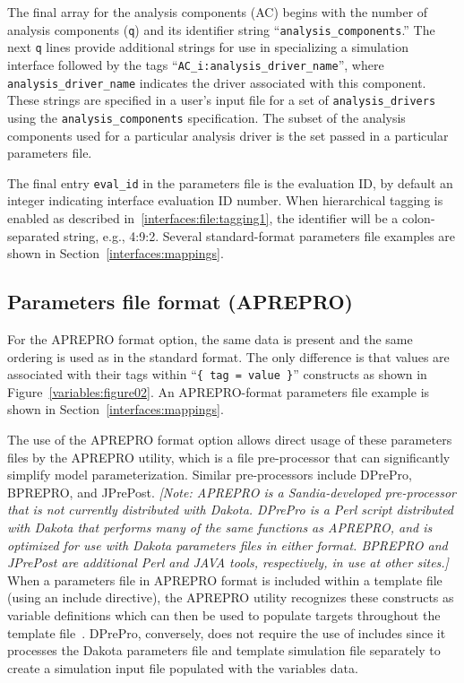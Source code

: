 The final array for the analysis components (AC) begins with the
number of analysis components (\texttt{q}) and its identifier string
``\texttt{analysis\_components}.'' The next \texttt{q} lines provide
additional strings for use in specializing a simulation interface
followed by the tags ``\texttt{AC\_i:analysis\_driver\_name}'', where
\texttt{analysis\_driver\_name} indicates the driver associated with
this component.  These strings are specified in a user's input file
for a set of \texttt{analysis\_drivers} using the
\texttt{analysis\_components} specification.  The subset of the
analysis components used for a particular analysis driver is the set
passed in a particular parameters file.

The final entry {\tt eval\_id} in the parameters file is the
evaluation ID, by default an integer indicating interface evaluation
ID number.  When hierarchical tagging is enabled as described
in~\ref{interfaces:file:tagging1}, the identifier will be a
colon-separated string, e.g., 4:9:2.  Several standard-format
parameters file examples are shown in
Section~\ref{interfaces:mappings}.

\subsection{Parameters file format (APREPRO)}\label{variables:parameters:aprepro}

For the APREPRO format option, the same data is present and the same
ordering is used as in the standard format. The only difference is
that values are associated with their tags within ``\texttt{\{ tag =
value \}}'' constructs as shown in Figure~\ref{variables:figure02}.
An APREPRO-format parameters file example is shown in
Section~\ref{interfaces:mappings}.

The use of the APREPRO format option allows direct usage of these
parameters files by the APREPRO utility, which is a file pre-processor
that can significantly simplify model parameterization.  Similar
pre-processors include DPrePro, BPREPRO, and JPrePost.  \emph{[Note:
APREPRO is a Sandia-developed pre-processor that is not currently
distributed with Dakota.  DPrePro is a Perl script distributed with
Dakota that performs many of the same functions as APREPRO, and is
optimized for use with Dakota parameters files in either format.
BPREPRO and JPrePost are additional Perl and JAVA tools, respectively,
in use at other sites.]}  When a parameters file in APREPRO format is
included within a template file (using an include directive), the
APREPRO utility recognizes these constructs as variable definitions
which can then be used to populate targets throughout the template
file~\cite{Sja92}.  DPrePro, conversely, does not require the use of
includes since it processes the Dakota parameters file and template
simulation file separately to create a simulation input file populated
with the variables data.


